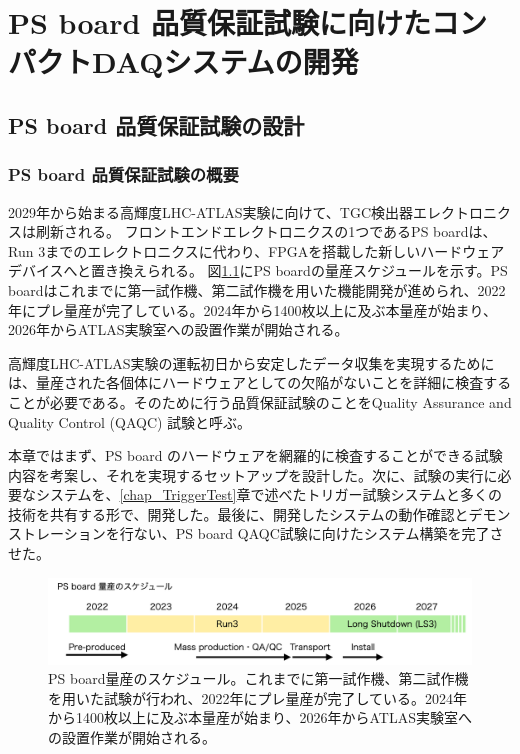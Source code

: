 \chapter{PS board 品質保証試験に向けたコンパクトDAQシステムの開発}
\label{chap_QAQC}

\section{PS board 品質保証試験の設計}
\label{sec_QAQCdesign}
\subsection{PS board 品質保証試験の概要}
\label{subsec_PSBschedule}
2029年から始まる高輝度LHC-ATLAS実験に向けて、TGC検出器エレクトロニクスは刷新される。
フロントエンドエレクトロニクスの1つであるPS boardは、Run 3までのエレクトロニクスに代わり、FPGAを搭載した新しいハードウェアデバイスへと置き換えられる。
図\ref{PSBschedule}にPS boardの量産スケジュールを示す。PS boardはこれまでに第一試作機、第二試作機を用いた機能開発が進められ、2022年にプレ量産が完了している。2024年から1400枚以上に及ぶ本量産が始まり、2026年からATLAS実験室への設置作業が開始される。


高輝度LHC-ATLAS実験の運転初日から安定したデータ収集を実現するためには、量産された各個体にハードウェアとしての欠陥がないことを詳細に検査することが必要である。そのために行う品質保証試験のことをQuality Assurance and Quality Control (QAQC) 試験と呼ぶ。

本章ではまず、PS board のハードウェアを網羅的に検査することができる試験内容を考案し、それを実現するセットアップを設計した。次に、試験の実行に必要なシステムを、\ref{chap_TriggerTest}章で述べたトリガー試験システムと多くの技術を共有する形で、開発した。最後に、開発したシステムの動作確認とデモンストレーションを行ない、PS board QAQC試験に向けたシステム構築を完了させた。

\begin{figure} 
\centering
\includegraphics[width=16cm]{fig/QAQC/PSBschedule.png}
\caption[PS board量産のスケジュール]{PS board量産のスケジュール。これまでに第一試作機、第二試作機を用いた試験が行われ、2022年にプレ量産が完了している。2024年から1400枚以上に及ぶ本量産が始まり、2026年からATLAS実験室への設置作業が開始される。}
\label{PSBschedule}
\end{figure}

